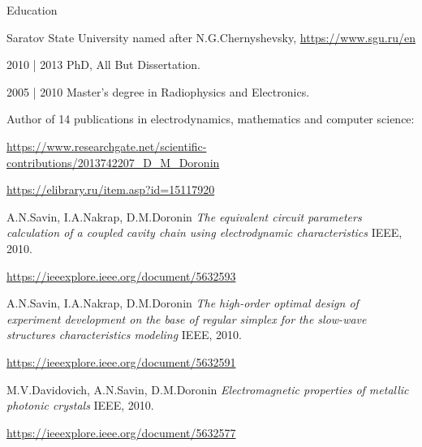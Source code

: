 \documentclass{resume}
\begin{document}
\begin{rSection}{Education}

\begin{rSubsection}{Saratov State University named after N.G.Chernyshevsky, \url{https://www.sgu.ru/en}}{}{}{}

      2010 | 2013 PhD, All But Dissertation.

      2005 | 2010 Master's degree in Radiophysics and Electronics.


      Author of 14 publications in electrodynamics, mathematics and computer science:
      \item[] \url{https://www.researchgate.net/scientific-contributions/2013742207_D_M_Doronin}
      \item[] \url{https://elibrary.ru/item.asp?id=15117920}

\bigskip
\renewcommand{\section}[2]{\textbf{SELECTED PUBLICATIONS}}
\begin{thebibliography}{}

    \bibitem{} 
    A.N.Savin, I.A.Nakrap, D.M.Doronin
    \textit{The equivalent circuit parameters calculation of a coupled cavity chain using electrodynamic characteristics}
    IEEE, 2010.

    \url{https://ieeexplore.ieee.org/document/5632593}

    \bibitem{} 
    A.N.Savin, I.A.Nakrap, D.M.Doronin
    \textit{The high-order optimal design of experiment development on the base of regular simplex for the slow-wave structures characteristics modeling}
    IEEE, 2010.

    \url{https://ieeexplore.ieee.org/document/5632591}


    M.V.Davidovich, A.N.Savin, D.M.Doronin
    \textit{Electromagnetic properties of metallic photonic crystals}
    IEEE, 2010.

    \url{https://ieeexplore.ieee.org/document/5632577}
\end{thebibliography}

\end{rSubsection}
\end{rSection}
\end{document}
